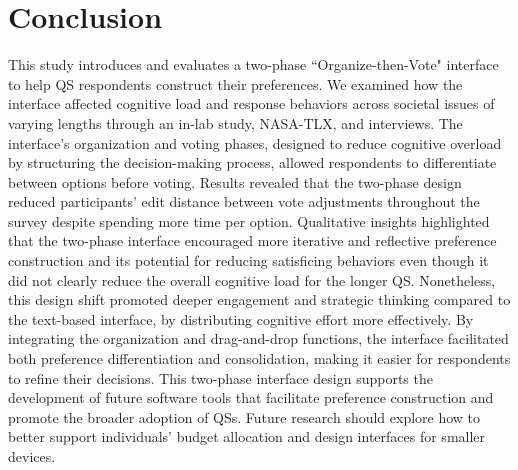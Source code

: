 \section{Conclusion}
This study introduces and evaluates a two-phase ``Organize-then-Vote" interface to help QS respondents construct their preferences. We examined how the interface affected cognitive load and response behaviors across societal issues of varying lengths through an in-lab study, NASA-TLX, and interviews. The interface's organization and voting phases, designed to reduce cognitive overload by structuring the decision-making process, allowed respondents to differentiate between options before voting. Results revealed that the two-phase design reduced participants' edit distance between vote adjustments throughout the survey despite spending more time per option. Qualitative insights highlighted that the two-phase interface encouraged more iterative and reflective preference construction and its potential for reducing satisficing behaviors even though it did not clearly reduce the overall cognitive load for the longer QS. Nonetheless, this design shift promoted deeper engagement and strategic thinking compared to the text-based interface, by distributing cognitive effort more effectively. By integrating the organization and drag-and-drop functions, the interface facilitated both preference differentiation and consolidation, making it easier for respondents to refine their decisions. This two-phase interface design supports the development of future software tools that facilitate preference construction and promote the broader adoption of QSs. Future research should explore how to better support individuals' budget allocation and design interfaces for smaller devices.

